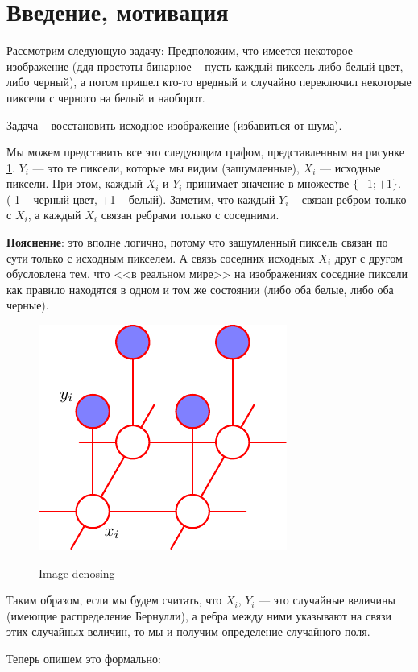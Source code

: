 \documentclass[12pt]{article}
\begin{document}
\section{Введение, мотивация}
Рассмотрим следующую задачу:
Предположим, что имеется некоторое изображение (ддя простоты бинарное -- пусть каждый пиксель либо белый цвет, либо черный), а потом пришел кто-то вредный и случайно переключил некоторые пиксели с черного на белый и наоборот. 

Задача -- восстановить исходное изображение (избавиться от шума). 

Мы можем представить все это следующим графом, представленным на рисунке \ref{fig:ex}. $Y_i$ --- это те пиксели, которые мы видим (зашумленные), $X_i$ --- исходные пиксели. При этом, каждый $X_i$ и $Y_i$ принимает значение в множестве $\{ -1; +1\}$. (-1 -- черный цвет, +1 -- белый).
Заметим, что каждый $Y_i$ -- связан ребром только с $X_i$, а каждый $X_i$ связан ребрами только с соседними.


\textbf{Пояснение}: это вполне логично, потому что зашумленный пиксель связан по сути только с исходным пикселем. А связь соседних исходных $X_i$ друг с другом обусловлена тем, что <<в реальном мире>> на изображениях соседние пиксели как правило находятся в одном и том же состоянии (либо оба белые, либо оба черные).
\begin{figure}[hhh]
\centering
\includegraphics[width=.5\linewidth]{./figures/image.pdf}
\label{fig:ex}
\caption{Image denosing}
\end{figure}

Таким образом, если мы будем считать, что $X_i$, $Y_i$ --- это случайные величины (имеющие распределение Бернулли), а ребра между ними указывают на связи этих случайных величин, то мы и получим определение случайного поля. 

Теперь опишем это формально:
\end{document}

